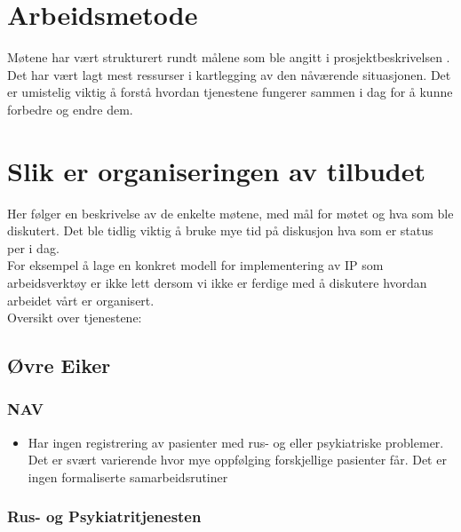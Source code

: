 \documentclass[11pt]{report} %
\begin{document}
  \chapter{Arbeidsmetode}\label{chap:meto}
    Møtene har vært strukturert rundt målene som ble angitt i prosjektbeskrivelsen
    \cite{ProPlan-1}. Det har vært lagt mest ressurser i kartlegging av den nåværende situasjonen. Det er umistelig viktig å forstå hvordan tjenestene fungerer sammen i dag for å kunne forbedre og endre dem.\\

  \chapter{Slik er organiseringen av tilbudet}\label{chap:org}
    Her følger en beskrivelse av de enkelte møtene, med mål for møtet og hva som ble diskutert. Det ble tidlig viktig å bruke mye tid på diskusjon hva som er status per i dag.\\
    For eksempel å lage en konkret modell for implementering av IP som arbeidsverktøy er ikke lett dersom vi ikke er ferdige med å diskutere hvordan arbeidet vårt er organisert.\\
    Oversikt over tjenestene:\\
     
    \section{Øvre Eiker}\label{sec:org_oek}
        
        \subsection{NAV}
          \begin{itemize} 
            \item Har ingen registrering av pasienter med rus- og eller psykiatriske problemer. Det er svært varierende hvor mye oppfølging forskjellige pasienter får. Det er ingen formaliserte samarbeidsrutiner
          \end{itemize}
        
        \subsection{Rus- og Psykiatritjenesten}
        	
\end{document}
